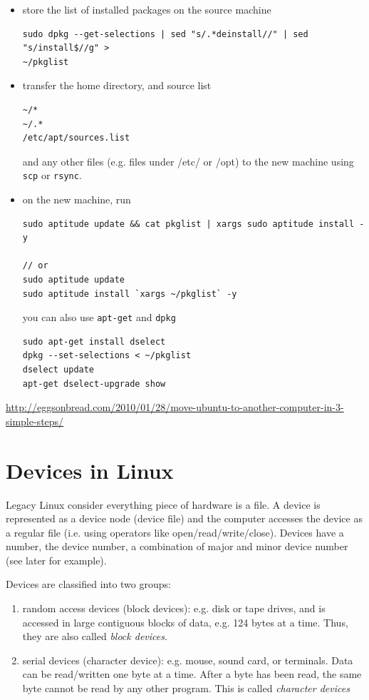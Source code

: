 \begin{itemize}
  \item store the list of installed packages on the source machine
\begin{verbatim}
sudo dpkg --get-selections | sed "s/.*deinstall//" | sed "s/install$//g" >
~/pkglist
\end{verbatim}

  \item transfer the home directory, and source list 
\begin{verbatim}
~/*
~/.*
/etc/apt/sources.list
\end{verbatim}
and any other files (e.g. files under /etc/ or /opt) to the new machine using
\verb!scp! or \verb!rsync!. 
 
  \item on the new machine, run
\begin{verbatim}
sudo aptitude update && cat pkglist | xargs sudo aptitude install -y

// or 
sudo aptitude update
sudo aptitude install `xargs ~/pkglist` -y
\end{verbatim}

you can also use \verb!apt-get! and \verb!dpkg!
\begin{verbatim}
sudo apt-get install dselect
dpkg --set-selections < ~/pkglist
dselect update
apt-get dselect-upgrade show
\end{verbatim}

\end{itemize}
\url{http://eggsonbread.com/2010/01/28/move-ubuntu-to-another-computer-in-3-simple-steps/}


\section{Devices in Linux}
\label{sec:devices}

Legacy Linux consider everything piece of hardware is a file. A device is
represented as a device node (device file) and the computer accesses the device
as a regular file (i.e. using operators like open/read/write/close). Devices
have a number, the device number, a combination of major and minor device
number (see later for
example).

Devices are classified into two groups:
\begin{enumerate}
  \item random access devices (block devices): e.g. disk or tape drives, and is
  accessed in large contiguous blocks of data, e.g. 124 bytes at a time. Thus,
  they are also called {\it block devices}.
    
  \item serial devices (character device): e.g. mouse, sound card, or terminals.
  Data can be read/written one byte at a time. After a byte has been read, the
  same byte cannot be read by any other program. This is called {\it character
  devices}
\end{enumerate}

